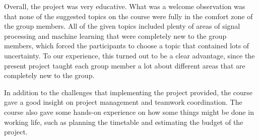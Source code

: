 Overall, the project was very educative. What was a welcome observation was that none of the suggested topics on the course were fully in the comfort zone of the group members. All of the given topics included plenty of areas of signal processing and machine learning that were completely new to the group members, which forced the participants to choose a topic that contained lots of uncertainty. To our experience, this turned out to be a clear advantage, since the present project taught each group member a lot about different areas that are completely new to the group.

In addition to the challenges that implementing the project provided, the course gave a good insight on project management and teamwork coordination. The course also gave some hands-on experience on how some things might be done in working life, such as planning the timetable and estimating the budget of the project.

